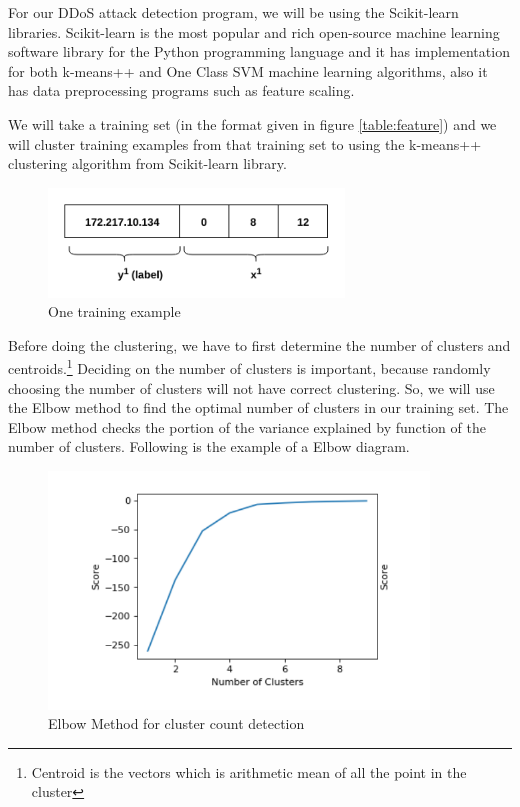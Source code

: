 \documentclass[12pt,oneside,a4paper]{article}
\begin{document}
For our DDoS attack detection program, we will be using the Scikit-learn libraries. Scikit-learn is the most popular and rich open-source machine learning software library for the Python programming language and it has implementation for both k-means++ and One Class SVM machine learning algorithms, also it has data preprocessing programs such as feature scaling.

We will take a training set (in the format given in figure \ref{table:feature}) and we will cluster training examples from that training set to using the k-means++ clustering algorithm from Scikit-learn library.

\begin{figure}[H]
\centering
\includegraphics[width=0.70\textwidth]{training_example.png}
\caption{One training example} \label{fig:training_example}
\end{figure}

Before doing the clustering, we have to first determine the number of clusters and centroids.\footnote{Centroid is the vectors which is arithmetic mean of all the point in the cluster} Deciding on the number of clusters is important, because randomly choosing the number of clusters will not have correct clustering. So, we will use the Elbow method to find the optimal number of clusters in our training set. The Elbow method checks the portion of the variance explained by function of the number of clusters. Following is the example of a Elbow diagram.

\begin{figure}[H]
\centering
\includegraphics[width=0.90\textwidth]{elbow-method.png}
\caption{Elbow Method for cluster count detection} \label{fig:elbow-method}
\end{figure}
\end{document}
